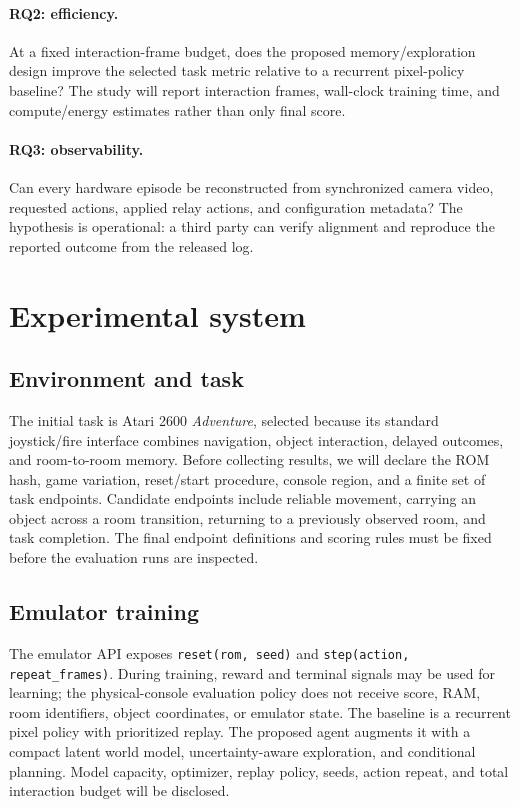 \documentclass[11pt]{article}
\begin{document}
\paragraph{RQ2: efficiency.} At a fixed interaction-frame budget, does the
proposed memory/exploration design improve the selected task metric relative to
a recurrent pixel-policy baseline?  The study will report interaction frames,
wall-clock training time, and compute/energy estimates rather than only final
score.

\paragraph{RQ3: observability.} Can every hardware episode be reconstructed
from synchronized camera video, requested actions, applied relay actions, and
configuration metadata?  The hypothesis is operational: a third party can
verify alignment and reproduce the reported outcome from the released log.

\section{Experimental system}

\subsection{Environment and task}

The initial task is Atari 2600 \emph{Adventure}, selected because its
standard joystick/fire interface combines navigation, object interaction,
delayed outcomes, and room-to-room memory.  Before collecting results, we
will declare the ROM hash, game variation, reset/start procedure, console
region, and a finite set of task endpoints.  Candidate endpoints include
reliable movement, carrying an object across a room transition, returning to a
previously observed room, and task completion.  The final endpoint definitions
and scoring rules must be fixed before the evaluation runs are inspected.

\subsection{Emulator training}

The emulator API exposes \texttt{reset(rom, seed)} and
\texttt{step(action, repeat\_frames)}.  During training, reward and terminal
signals may be used for learning; the physical-console evaluation policy does
not receive score, RAM, room identifiers, object coordinates, or emulator
state.  The baseline is a recurrent pixel policy with prioritized replay.  The
proposed agent augments it with a compact latent world model, uncertainty-aware
exploration, and conditional planning.  Model capacity, optimizer, replay
policy, seeds, action repeat, and total interaction budget will be disclosed.
\end{document}
